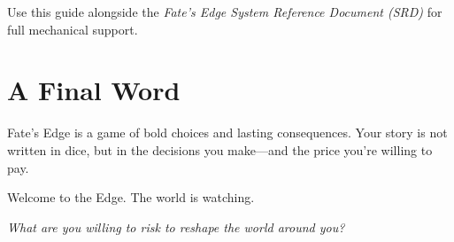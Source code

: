 Use this guide alongside the \emph{Fate’s Edge System Reference Document (SRD)} for full mechanical support.

\section*{A Final Word}

Fate’s Edge is a game of bold choices and lasting consequences. Your story is not written in dice, but in the decisions you make—and the price you’re willing to pay.

Welcome to the Edge. The world is watching.

\begin{center}
  \emph{What are you willing to risk to reshape the world around you?}
\end{center}

